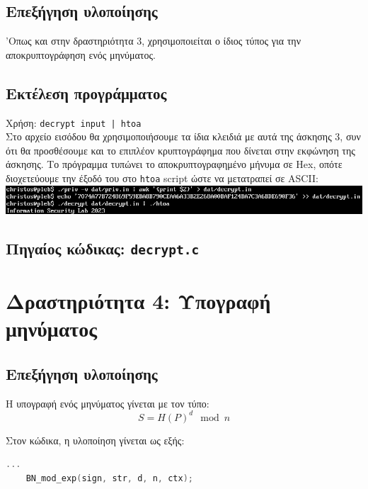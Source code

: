 \documentclass[12pt]{article}
\begin{document}
\subsection{Επεξήγηση υλοποίησης}

'Οπως και στην δραστηριότητα 3, χρησιμοποιείται ο ίδιος τύπος για την
αποκρυπτογράφηση ενός μηνύματος.

\subsection{Εκτέλεση προγράμματος}

Χρήση: \lstinline{decrypt input | htoa} \\

Στο αρχείο εισόδου θα χρησιμοποιήσουμε τα ίδια κλειδιά με αυτά της άσκησης 3,
συν ότι θα προσθέσουμε και το επιπλέον κρυπτογράφημα που δίνεται στην εκφώνηση
της άσκησης. Το πρόγραμμα τυπώνει το αποκρυπτογραφημένο μήνυμα σε Hex, οπότε
διοχετεύουμε την έξοδό του στο \lstinline{htoa} script ώστε να μετατραπεί σε
ASCII: \\

\includegraphics[width=\textwidth]{res/decrypt.png} \\

\subsection{Πηγαίος κώδικας: \lstinline{decrypt.c}}



\section{Δραστηριότητα 4: Υπογραφή μηνύματος}

\subsection{Επεξήγηση υλοποίησης}

Η υπογραφή ενός μηνύματος γίνεται με τον τύπο:
\[S = H(P)^d \mod n\]

Στον κώδικα, η υλοποίηση γίνεται ως εξής: \\
\begin{lstlisting}[language=C]
	...
	BN_mod_exp(sign, str, d, n, ctx);
\end{lstlisting}
\end{document}
